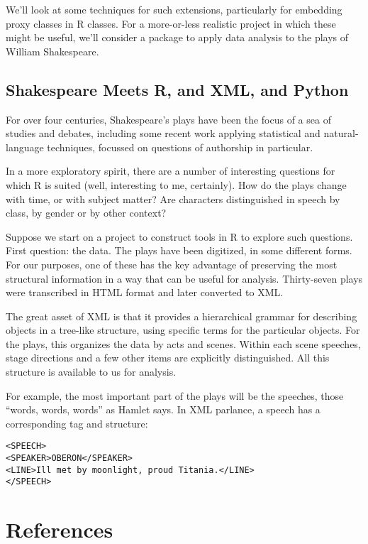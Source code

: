 \documentclass{article}
\begin{document}
We'll look at some techniques for such extensions, particularly for
embedding proxy classes in R classes. For a more-or-less realistic
project in which these might be useful, we'll consider a package to
apply data analysis to the plays of William Shakespeare.

\subsection{Shakespeare Meets R, and XML, and
Python}\label{shakespeare-meets-r-and-xml-and-python}

For over four centuries, Shakespeare's plays have been the focus of a
sea of studies and debates, including some recent work applying
statistical and natural-language techniques, focussed on questions of
authorship in particular.

In a more exploratory spirit, there are a number of interesting
questions for which R is suited (well, interesting to me, certainly).
How do the plays change with time, or with subject matter? Are
characters distinguished in speech by class, by gender or by other
context?

Suppose we start on a project to construct tools in R to explore such
questions. First question: the data. The plays have been digitized, in
some different forms. For our purposes, one of these has the key
advantage of preserving the most structural information in a way that
can be useful for analysis. Thirty-seven plays were transcribed in HTML
format and later converted to XML.

The great asset of XML is that it provides a hierarchical grammar for
describing objects in a tree-like structure, using specific terms for
the particular objects. For the plays, this organizes the data by acts
and scenes. Within each scene speeches, stage directions and a few other
items are explicitly distinguished. All this structure is available to
us for analysis.

For example, the most important part of the plays will be the speeches,
those ``words, words, words'' as Hamlet says. In XML parlance, a speech
has a corresponding tag and structure:

\begin{verbatim}
<SPEECH>
<SPEAKER>OBERON</SPEAKER>
<LINE>Ill met by moonlight, proud Titania.</LINE>
</SPEECH>
\end{verbatim}

\section*{References}

\end{document}
